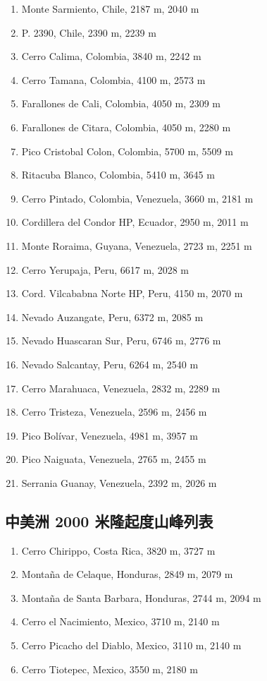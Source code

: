 \documentclass[10pt,twocolumn,letterpaper]{article}
\begin{document}
\begin{flushleft}
\begin{enumerate}
    \item Monte Sarmiento, Chile, 2187 m, 2040 m
    \item P. 2390, Chile, 2390 m, 2239 m
    \item Cerro Calima, Colombia, 3840 m, 2242 m
    \item Cerro Tamana, Colombia, 4100 m, 2573 m
    \item Farallones de Cali, Colombia, 4050 m, 2309 m
    \item Farallones de Citara, Colombia, 4050 m, 2280 m
    \item Pico Cristobal Colon, Colombia, 5700 m, 5509 m
    \item Ritacuba Blanco, Colombia, 5410 m, 3645 m
    \item Cerro Pintado, Colombia, Venezuela, 3660 m, 2181 m
    \item Cordillera del Condor HP, Ecuador, 2950 m, 2011 m
    \item Monte Roraima, Guyana, Venezuela, 2723 m, 2251 m
    \item Cerro Yerupaja, Peru, 6617 m, 2028 m
    \item Cord. Vilcababna Norte HP, Peru, 4150 m, 2070 m
    \item Nevado Auzangate, Peru, 6372 m, 2085 m
    \item Nevado Huascaran Sur, Peru, 6746 m, 2776 m
    \item Nevado Salcantay, Peru, 6264 m, 2540 m
    \item Cerro Marahuaca, Venezuela, 2832 m, 2289 m
    \item Cerro Tristeza, Venezuela, 2596 m, 2456 m
    \item Pico Bolívar, Venezuela, 4981 m, 3957 m
    \item Pico Naiguata, Venezuela, 2765 m, 2455 m
    \item Serrania Guanay, Venezuela, 2392 m, 2026 m
\end{enumerate}
\end{flushleft}

\subsection{中美洲 2000 米隆起度山峰列表}

\begin{flushleft}
\begin{enumerate}
    \item Cerro Chirippo, Costa Rica, 3820 m, 3727 m
    \item Montaña de Celaque, Honduras, 2849 m, 2079 m
    \item Montaña de Santa Barbara, Honduras, 2744 m, 2094 m
    \item Cerro el Nacimiento, Mexico, 3710 m, 2140 m
    \item Cerro Picacho del Diablo, Mexico, 3110 m, 2140 m
    \item Cerro Tiotepec, Mexico, 3550 m, 2180 m
\end{enumerate}
\end{flushleft}
\end{document}

